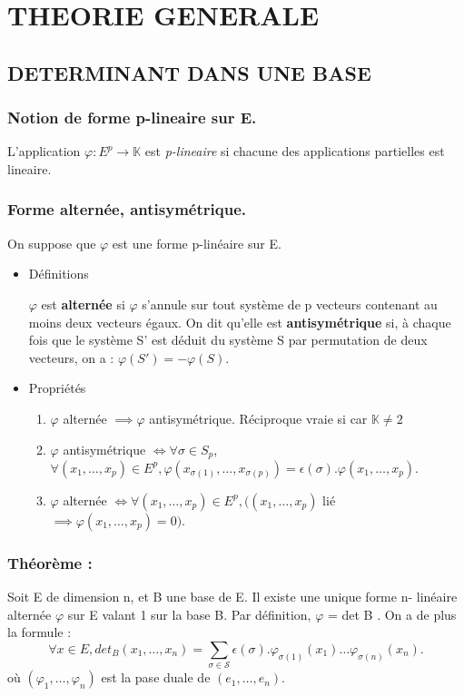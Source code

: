 \documentclass[a4paper,12pt]{article}
\title{\letitle}
\author{\leauthor}
\date{}
\begin{document}
    \section{THEORIE GENERALE}

\subsection{DETERMINANT DANS UNE BASE}

\subsubsection{Notion de forme p-lineaire sur E.}

L'application $\varphi:E^p \rightarrow \mathbb{K}$
 est {\it p-lineaire} si chacune des applications partielles
 est lineaire.

\subsubsection{Forme alternée, antisymétrique.}

On suppose que $\varphi$ est une forme p-linéaire sur E.

\begin{itemize}
\item Définitions

$\varphi$ est \textbf{ alternée } si $\varphi$ s’annule sur tout système de p vecteurs contenant au moins
deux vecteurs égaux. On dit qu’elle est \textbf{ antisymétrique } si, à chaque fois que le système S'
est déduit du système S par permutation de deux vecteurs, on a : $\varphi(S')=-\varphi(S)$.

\item Propriétés

\begin{enumerate}
\item $\varphi$ alternée $\implies \varphi$ antisymétrique. Réciproque vraie si car $\mathbb{K}\neq 2$

\item $\varphi$ antisymétrique $\iff \forall \sigma \in S_p$, $\forall (x_1,\hdots,x_p) 
\in E^p, \varphi(x_{\sigma(1)},\hdots,x_{\sigma(p)})=\epsilon (\sigma).\varphi(x_1,\hdots,x_p)$.

\item $\varphi$ alternée $\iff \forall (x_1,\hdots,x_p)\in E^p, ((x_1,\hdots,x_p)$ 
lié $\implies \varphi (x_1,\hdots,x_p) = 0)$.
\end{enumerate}
\end{itemize}

\subsubsection{\textbf{Théorème :}}
Soit E de dimension n, et B une base de E. Il existe une unique forme n-
linéaire alternée $\varphi$ sur E valant 1 sur la base B. Par déﬁnition, $\varphi$ = det B . On a de plus la
formule :
\begin{equation}\forall x \in E, det_B(x_1,\hdots,x_n)=\sum_{\sigma \in \mathcal{S}} 
\epsilon (\sigma).\varphi_{\sigma(1)}(x_1)\hdots \varphi_{\sigma(n)}(x_n).\end{equation}
où $(\varphi_1,\hdots,\varphi_n)$ est la pase duale de $(e_1,\hdots,e_n)$.
\end{document}
